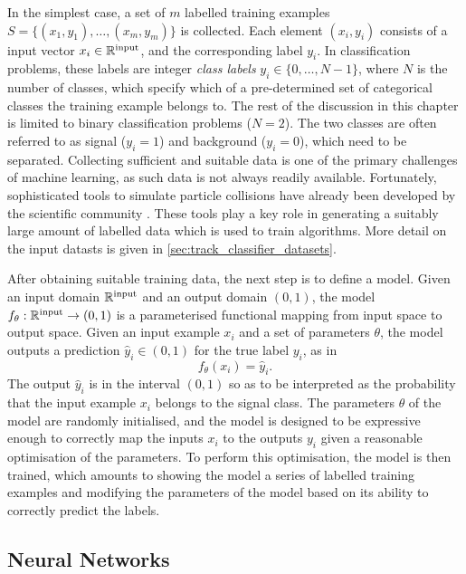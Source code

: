 In the simplest case, a set of $m$ labelled training examples $S = \{ (x_1, y_1) , \ldots , (x_m, y_m) \}$ is collected.
Each element $(x_i, y_i)$ consists of a input vector $x_i  \in \mathbb{R}^{\textnormal{input}}$, and the corresponding label $y_i$.
In classification problems, these labels are integer \textit{class labels} $y_i \in \{0,\ldots,N-1\}$, where $N$ is the number of classes, which specify which of a pre-determined set of categorical classes the training example belongs to.
The rest of the discussion in this chapter is limited to binary classification problems ($N = 2$).
The two classes are often referred to as signal ($y_i = 1$) and background ($y_i = 0$), which need to be separated.
Collecting sufficient and suitable data is one of the primary challenges of machine learning, as such data is not always readily available.
Fortunately, sophisticated tools to simulate particle collisions have already been developed by the scientific community \cite{leshouchesaccords, leshouchesstandardisation}.
These tools play a key role in generating a suitably large amount of labelled data which is used to train algorithms.
More detail on the input datasts is given in \cref{sec:track_classifier_datasets}.

After obtaining suitable training data, the next step is to define a model.
Given an input domain $\mathbb{R}^{\textnormal{input}}$ and an output domain $(0, 1)$, the model
$f_\theta: \mathbb{R}^{\textnormal{input}} \to (0, 1)$ is a parameterised functional mapping from input space to output space.
Given an input example $x_i$ and a set of parameters $\theta$, the model outputs a prediction $\hat{y}_i \in (0, 1)$ for the true label $y_i$, as in
%
\begin{equation}
    f_\theta(x_i) = \hat{y}_i .
\end{equation}
%
The output $\hat{y}_i$ is in the interval $(0, 1)$ so as to be interpreted as the probability that the input example $x_i$ belongs to the signal class.
The parameters $\theta$ of the model are randomly initialised, and the model is designed to be expressive enough to correctly map the inputs $x_i$ to the outputs $y_i$ given a reasonable optimisation of the parameters.
To perform this optimisation, the model is then trained, which amounts to showing the model a series of labelled training examples and modifying the parameters of the model based on its ability to correctly predict the labels.


\subsection{Neural Networks}\label{sec:neural_nets}

